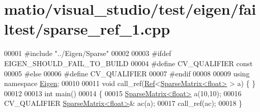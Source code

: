 \hypertarget{matio_2visual__studio_2test_2eigen_2failtest_2sparse__ref__1_8cpp_source}{}\section{matio/visual\+\_\+studio/test/eigen/failtest/sparse\+\_\+ref\+\_\+1.cpp}
\label{matio_2visual__studio_2test_2eigen_2failtest_2sparse__ref__1_8cpp_source}

\begin{DoxyCode}
00001 \textcolor{preprocessor}{#include "../Eigen/Sparse"}
00002 
00003 \textcolor{preprocessor}{#ifdef EIGEN\_SHOULD\_FAIL\_TO\_BUILD}
00004 \textcolor{preprocessor}{#define CV\_QUALIFIER const}
00005 \textcolor{preprocessor}{#else}
00006 \textcolor{preprocessor}{#define CV\_QUALIFIER}
00007 \textcolor{preprocessor}{#endif}
00008 
00009 \textcolor{keyword}{using namespace }\hyperlink{namespace_eigen}{Eigen};
00010 
00011 \textcolor{keywordtype}{void} call\_ref(\hyperlink{group___core___module_class_eigen_1_1_ref}{Ref}<\hyperlink{group___sparse_core___module_class_eigen_1_1_sparse_matrix}{SparseMatrix<float>} > a) \{ \}
00012 
00013 \textcolor{keywordtype}{int} main()
00014 \{
00015   \hyperlink{group___sparse_core___module_class_eigen_1_1_sparse_matrix}{SparseMatrix<float>} a(10,10);
00016   CV\_QUALIFIER \hyperlink{group___sparse_core___module_class_eigen_1_1_sparse_matrix}{SparseMatrix<float>}& ac(a);
00017   call\_ref(ac);
00018 \}
\end{DoxyCode}
